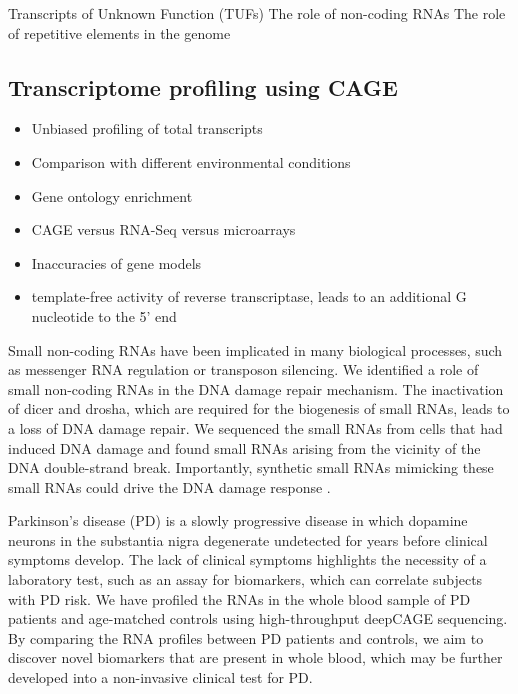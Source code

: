 Transcripts of Unknown Function (TUFs)
The role of non-coding RNAs
The role of repetitive elements in the genome

\subsection{Transcriptome profiling using CAGE}

\begin{itemize}
   \item Unbiased profiling of total transcripts
   \item Comparison with different environmental conditions
   \item Gene ontology enrichment
   \item CAGE versus RNA-Seq versus microarrays\cite{pmid24676093}
   \item Inaccuracies of gene models
   \item template-free activity of reverse transcriptase, leads to an additional G nucleotide to the 5' end
\end{itemize}

Small non-coding RNAs have been implicated in many biological processes, such as messenger RNA regulation or transposon silencing. We identified a role of small non-coding RNAs in the DNA damage repair mechanism. The inactivation of dicer and drosha, which are required for the biogenesis of small RNAs, leads to a loss of DNA damage repair. We sequenced the small RNAs from cells that had induced DNA damage and found small RNAs arising from the vicinity of the DNA double-strand break. Importantly, synthetic small RNAs mimicking these small RNAs could drive the DNA damage response \cite{francia2012site}.

Parkinson’s disease (PD) is a slowly progressive disease in which dopamine neurons in the substantia nigra degenerate undetected for years before clinical symptoms develop. The lack of clinical symptoms highlights the necessity of a laboratory test, such as an assay for biomarkers, which can correlate subjects with PD risk. We have profiled the RNAs in the whole blood sample of PD patients and age-matched controls using high-throughput deepCAGE sequencing. By comparing the RNA profiles between PD patients and controls, we aim to discover novel biomarkers that are present in whole blood, which may be further developed into a non-invasive clinical test for PD.
